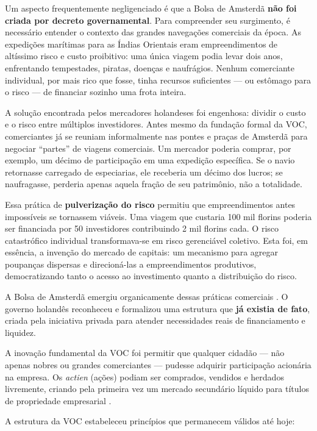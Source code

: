 Um aspecto frequentemente negligenciado é que a Bolsa de Amsterdã \textbf{não foi criada por decreto governamental}. Para compreender seu surgimento, é necessário entender o contexto das grandes navegações comerciais da época. As expedições marítimas para as Índias Orientais eram empreendimentos de altíssimo risco e custo proibitivo: uma única viagem podia levar dois anos, enfrentando tempestades, piratas, doenças e naufrágios. Nenhum comerciante individual, por mais rico que fosse, tinha recursos suficientes --- ou estômago para o risco --- de financiar sozinho uma frota inteira.

A solução encontrada pelos mercadores holandeses foi engenhosa: dividir o custo e o risco entre múltiplos investidores. Antes mesmo da fundação formal da VOC, comerciantes já se reuniam informalmente nas pontes e praças de Amsterdã para negociar ``partes'' de viagens comerciais. Um mercador poderia comprar, por exemplo, um décimo de participação em uma expedição específica. Se o navio retornasse carregado de especiarias, ele receberia um décimo dos lucros; se naufragasse, perderia apenas aquela fração de seu patrimônio, não a totalidade.

Essa prática de \textbf{pulverização do risco} permitiu que empreendimentos antes impossíveis se tornassem viáveis. Uma viagem que custaria 100 mil florins poderia ser financiada por 50 investidores contribuindo 2 mil florins cada. O risco catastrófico individual transformava-se em risco gerenciável coletivo. Esta foi, em essência, a invenção do mercado de capitais: um mecanismo para agregar poupanças dispersas e direcioná-las a empreendimentos produtivos, democratizando tanto o acesso ao investimento quanto a distribuição do risco.

A Bolsa de Amsterdã emergiu organicamente dessas práticas comerciais \cite{petram2014}. O governo holandês reconheceu e formalizou uma estrutura que \textbf{já existia de fato}, criada pela iniciativa privada para atender necessidades reais de financiamento e liquidez.

A inovação fundamental da VOC foi permitir que qualquer cidadão --- não apenas nobres ou grandes comerciantes --- pudesse adquirir participação acionária na empresa. Os \textit{actien} (ações) podiam ser comprados, vendidos e herdados livremente, criando pela primeira vez um mercado secundário líquido para títulos de propriedade empresarial \cite{petram2014}.

A estrutura da VOC estabeleceu princípios que permanecem válidos até hoje:

